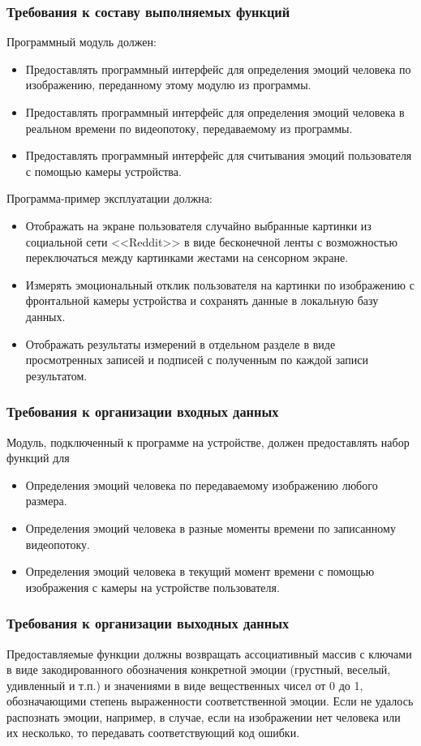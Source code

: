 \documentclass[a4paper,12pt,reqno]{article}
\begin{document}
    \subsubsection{Требования к составу выполняемых функций}
    Программный модуль должен:
    \begin{itemize}
        \item Предоставлять программный интерфейс для определения эмоций человека по изображению, переданному этому модулю из программы.
        \item Предоставлять программный интерфейс для определения эмоций человека в реальном времени по видеопотоку, передаваемому из программы.
        \item Предоставлять программный интерфейс для считывания эмоций пользователя с помощью камеры устройства.
    \end{itemize}
    Программа-пример эксплуатации должна:
    \begin{itemize}
        \item Отображать на экране пользователя случайно выбранные картинки из социальной сети <<Reddit>> в виде бесконечной ленты с возможностью переключаться между картинками жестами на сенсорном экране.
        \item Измерять эмоциональный отклик пользователя на картинки по изображению с фронтальной камеры устройства и сохранять данные в локальную базу данных.
        \item Отображать результаты измерений в отдельном разделе в виде просмотренных записей и подписей с полученным по каждой записи результатом.
    \end{itemize}
    \subsubsection{Требования к организации входных данных}
    Модуль, подключенный к программе на устройстве, должен предоставлять набор функций для
    \begin{itemize}
        \item Определения эмоций человека по передаваемому изображению любого размера.
        \item Определения эмоций человека в разные моменты времени по записанному видеопотоку.
        \item Определения эмоций человека в текущий момент времени с помощью изображения с камеры на устройстве пользователя.
    \end{itemize}
    \subsubsection{Требования к организации выходных данных}
    Предоставляемые функции должны возвращать ассоциативный массив с ключами в виде закодированного обозначения конкретной эмоции (грустный, веселый, удивленный и т.п.) и значениями в виде вещественных чисел от 0 до 1, обозначающими степень выраженности соответственной эмоции. Если не удалось распознать эмоции, например, в случае, если на изображении нет человека или их несколько, то передавать соответствующий код ошибки.
\end{document}
